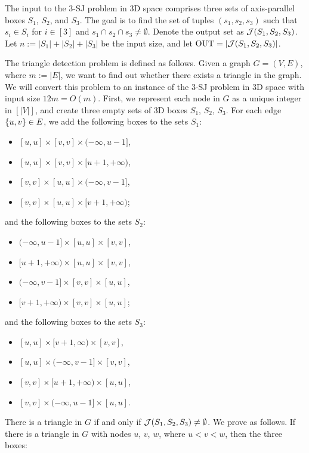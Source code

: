The input to the 3-SJ problem in 3D space comprises
 three sets of axis-parallel boxes $S_1$, $S_2$, and $S_3$. 
The goal is to find the set of tuples $(s_1,s_2,s_3)$ such that $s_i \in S_i$ for $i \in [3]$ and $s_1 \cap s_2 \cap s_3 \neq \emptyset$. Denote the output set as $\mathcal{J}(S_1,S_2,S_3)$.
Let $n:=|S_1|+|S_2|+|S_3|$ be the input size, and let $\mathrm{OUT} = |\mathcal{J}(S_1,S_2,S_3)|$.

The triangle detection problem is defined as follows. Given a graph $G = (V,E)$, where $m:=|E|$, we want to find out whether there exists a triangle in the graph. We will convert this problem to an instance of the 3-SJ problem in 3D space with input size $12m=O(m)$. First, we represent each node in $G$ as a unique integer in $[|V|]$, and create three empty sets of 3D boxes $S_1$, $S_2$, $S_3$. For each edge $\{u,v\}\in E$, we add the following boxes to the sets $S_1$:
\begin{itemize}
    \item $[u,u]\times [v,v]\times(-\infty,u-1]$,
    \item $[u,u]\times [v,v]\times[u+1,+\infty)$,
    \item $[v,v]\times [u,u] \times (-\infty,v-1]$,
    \item $[v,v]\times [u,u] \times [v+1,+\infty)$;
\end{itemize}
and the following boxes to the sets $S_2$:
\begin{itemize}
    \item $(-\infty,u-1]\times[u,u]\times [v,v]$,
    \item $[u+1,+\infty)\times[u,u]\times [v,v]$,
    \item $(-\infty,v-1] \times[v,v]\times [u,u]$,
    \item $ [v+1,+\infty)\times [v,v]\times [u,u]$;
\end{itemize}
and the following boxes to the sets $S_3$:
\begin{itemize}
    \item $[u,u]\times[v+1,\infty)\times [v,v]$,
    \item $[u,u]\times(-\infty,v-1]\times [v,v]$,
    \item $[v,v]\times[u+1,+\infty)\times [u,u]$,
    \item $[v,v]\times(-\infty,u-1]\times [u,u]$.
\end{itemize}
There is a triangle in $G$ if and only if $\mathcal{J}(S_1,S_2,S_3) \neq \emptyset$. We prove as follows. If there is a triangle in $G$ with nodes $u$, $v$, $w$, where $u < v < w$, then the three boxes:
